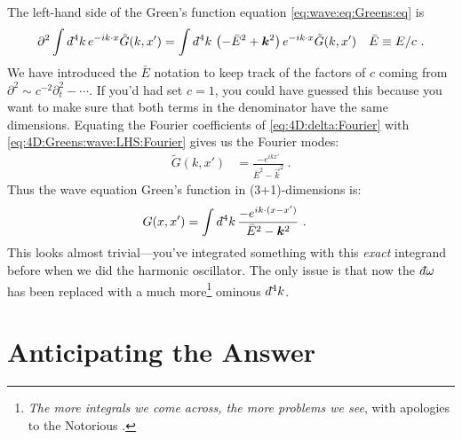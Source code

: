 \documentclass[
  11pt,
	colorful,
	raggedright,
]{tufte-style-thesis-flip}
\renewcommand{\dbar}{d\hspace*{-0.08em}\bar{}\hspace*{0.1em}}
\begin{document}
The left-hand side of the Green's function equation \eqref{eq:wave:eq:Greens:eq} is 
\begin{align}
  \partial^2 \int \dbar^4k \, e^{-ik\cdot x} \tilde G(k,x')
  &=
  \int \dbar^4k \, \left(-\bar{E}^2+\vec{k}^2\right) e^{-ik\cdot x} \tilde G(k,x')
  &
  \bar{E}\equiv E/c
   \ .
  \label{eq:4D:Greens:wave:LHS:Fourier}
\end{align}
We have introduced the $\bar E$ notation to keep track of the factors of $c$ coming from $\partial^2 \sim c^{-2}\partial_t^2 -\cdots$. If you'd had set $c=1$, you could have guessed this because you want to make sure that both terms in the denominator have the same dimensions.
Equating the Fourier coefficients of \eqref{eq:4D:delta:Fourier} with \eqref{eq:4D:Greens:wave:LHS:Fourier} gives us the Fourier modes:
\begin{align}
  \tilde G(k,x') &= \frac{-e^{ikx'}}{\bar{E}^2 - \vec{k}^2} \ .
\end{align}
Thus the wave equation Green's function in (3+1)-dimensions is:
\begin{align}
  G(x,x') &= \int \dbar^4k \, \frac{-e^{ik\cdot (x-x')}}{\bar{E}^2 - \vec{k}^2} \ .
  \label{eq:Greens:function:For:4D:int}
\end{align}
This looks almost trivial---you've integrated something with this \emph{exact} integrand before when we did the harmonic oscillator. The only issue is that now the $\dbar\omega$ has been replaced with a much more\footnote{\emph{The more integrals we come across, the more problems we see}, with apologies to the Notorious .} ominous $\dbar^4k$. 

\section{Anticipating the Answer}
\end{document}
